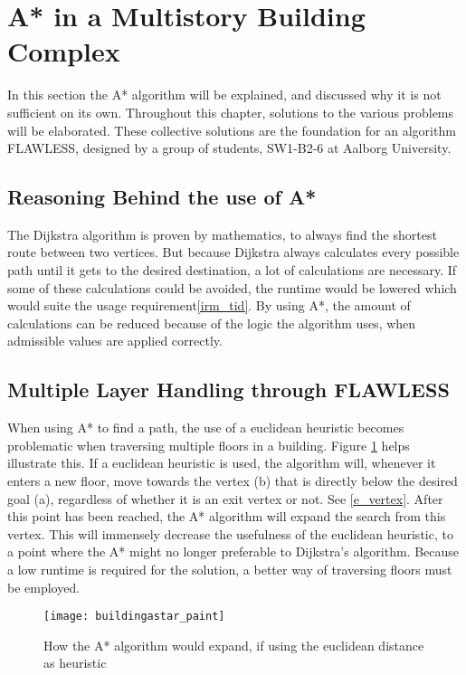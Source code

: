 \section{A* in a Multistory Building Complex}

In this section the A* algorithm will be explained, and discussed why it is not sufficient on its own. Throughout this chapter, solutions to the various problems will be elaborated. These collective solutions are the foundation for an algorithm FLAWLESS, designed by a group of students, SW1-B2-6 at Aalborg University. 

\subsection{Reasoning Behind the use of A*}
The Dijkstra algorithm is proven by mathematics, to always find the shortest route between two vertices. But because Dijkstra always calculates every possible path until it gets to the desired destination, a lot of calculations are necessary. If some of these calculations could be avoided, the runtime would be lowered which would suite the usage requirement\cref{irm_tid}. By using A*, the amount of calculations can be reduced because of the logic the algorithm uses, when admissible values are applied correctly.

\subsection{Multiple Layer Handling through FLAWLESS} \label{multlayhan}

When using A* to find a path, the use of a euclidean heuristic becomes problematic when traversing multiple floors in a building. Figure \ref{fig:buildingAstar} helps illustrate this. If a euclidean heuristic is used, the algorithm will, whenever it enters a new floor, move towards the vertex (b) that is directly below the desired goal (a), regardless of whether it is an exit vertex or not. See \cref{e_vertex}. After this point has been reached, the A* algorithm will expand the search from this vertex. This will immensely decrease the usefulness of the euclidean heuristic, to a point where the A* might no longer preferable to Dijkstra's algorithm. Because a low runtime is required for the solution, a better way of traversing floors must be employed.

\begin{figure}[ht!]
    \centering
    \texttt{[image: buildingastar\_paint]}
    \caption{How the A* algorithm would expand, if using the euclidean distance as heuristic}
    \label{fig:buildingAstar}
  \end{figure}

